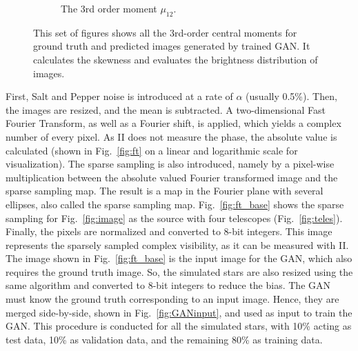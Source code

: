 \begin{figure}
\begin{subfigure}{0.50\linewidth}
		\caption{The 3rd order moment $\mu_{12}$.}
		\label{fig:mom10}
	\end{subfigure}\hfill
	\caption{This set of figures shows all the 3rd-order central moments for ground truth and predicted images generated by trained GAN. It calculates the skewness and evaluates the brightness distribution of images.}
	\label{fig:moments}
\end{figure}

First, Salt and Pepper noise is introduced at a rate of $\alpha$ (usually 0.5\%). Then, the images are resized, and the mean is subtracted. A two-dimensional Fast Fourier Transform, as well as a Fourier shift, is applied, which yields a complex number of every pixel. As II does not measure the phase, the absolute value is calculated (shown in Fig.~\ref{fig:ft} on a linear and logarithmic scale for visualization). The sparse sampling is also introduced, namely by a pixel-wise multiplication between the absolute valued Fourier transformed image and the sparse sampling map. The result is a map in the Fourier plane with several ellipses, also called the sparse sampling map. Fig.~\ref{fig:ft_base} shows the sparse sampling for Fig.~\ref{fig:image} as the source with four telescopes (Fig.~\ref{fig:teles}). Finally, the pixels are normalized and converted to 8-bit integers. This image represents the sparsely sampled complex visibility, as it can be measured with II. The image shown in Fig.~\ref{fig:ft_base} is the input image for the GAN, which also requires the ground truth image. So, the simulated stars are also resized using the same algorithm and converted to 8-bit integers to reduce the bias. The GAN must know the ground truth corresponding to an input image. Hence, they are merged side-by-side, shown in Fig.~\ref{fig:GANinput}, and used as input to train the GAN. This procedure is conducted for all the simulated stars, with 10\% acting as test data, 10\% as validation data, and the remaining 80\% as training data. 


